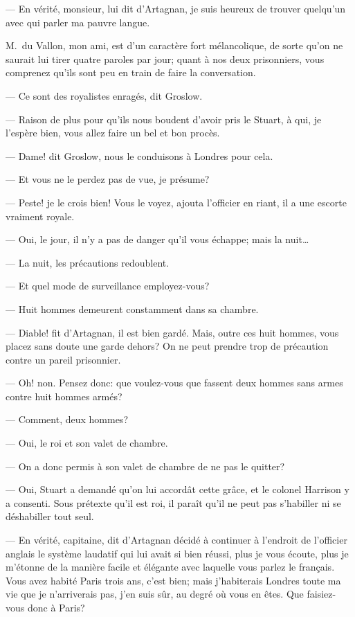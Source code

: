 — En vérité, monsieur, lui dit d'Artagnan, je suis heureux de trouver quelqu'un avec qui parler ma pauvre langue.

M.~du Vallon, mon ami, est d'un caractère fort mélancolique, de sorte qu'on ne saurait lui tirer quatre paroles par jour; quant à nos deux prisonniers, vous comprenez qu'ils sont peu en train de faire la conversation.

— Ce sont des royalistes enragés, dit Groslow.

— Raison de plus pour qu'ils nous boudent d'avoir pris le Stuart, à qui, je l'espère bien, vous allez faire un bel et bon procès.

— Dame! dit Groslow, nous le conduisons à Londres pour cela.

— Et vous ne le perdez pas de vue, je présume?

— Peste! je le crois bien! Vous le voyez, ajouta l'officier en riant, il a une escorte vraiment royale.

— Oui, le jour, il n'y a pas de danger qu'il vous échappe; mais la nuit\dots

— La nuit, les précautions redoublent.

— Et quel mode de surveillance employez-vous?

— Huit hommes demeurent constamment dans sa chambre.

— Diable! fit d'Artagnan, il est bien gardé. Mais, outre ces huit hommes, vous placez sans doute une garde dehors? On ne peut prendre trop de précaution contre un pareil prisonnier.

— Oh! non. Pensez donc: que voulez-vous que fassent deux hommes sans armes contre huit hommes armés?

— Comment, deux hommes?

— Oui, le roi et son valet de chambre.

— On a donc permis à son valet de chambre de ne pas le quitter?

— Oui, Stuart a demandé qu'on lui accordât cette grâce, et le colonel Harrison y a consenti. Sous prétexte qu'il est roi, il paraît qu'il ne peut pas s'habiller ni se déshabiller tout seul.

— En vérité, capitaine, dit d'Artagnan décidé à continuer à l'endroit de l'officier anglais le système laudatif qui lui avait si bien réussi, plus je vous écoute, plus je m'étonne de la manière facile et élégante avec laquelle vous parlez le français. Vous avez habité Paris trois ans, c'est bien; mais j'habiterais Londres toute ma vie que je n'arriverais pas, j'en suis sûr, au degré où vous en êtes. Que faisiez-vous donc à Paris?

